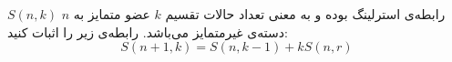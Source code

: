 \EXERCISE
$S(n, k)$
رابطه‌ی استرلینگ بوده و به معنی تعداد حالات تقسیم
$k$
عضو متمایز به
$n$
دسته‌ی غیرمتمایز می‌باشد. رابطه‌ی زیر را اثبات کنید:
$$S(n + 1, k) = S(n, k - 1) + kS(n, r)$$